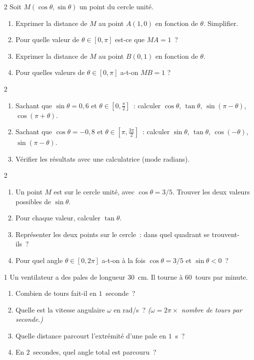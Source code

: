 \begin{probleme}{2}
Soit $M(\cos\theta,\sin\theta)$ un point du cercle unit\'e.
\begin{enumerate}
  \item Exprimer la distance de $M$ au point $A(1,0)$ en fonction de $\theta$.
        Simplifier.
  \item Pour quelle valeur de $\theta\in[0,\pi]$ est-ce que $MA=1$~?
  \item Exprimer la distance de $M$ au point $B(0,1)$ en fonction de $\theta$.
  \item Pour quelles valeurs de $\theta\in[0,\pi]$ a-t-on $MB=1$ ?
\end{enumerate}
\end{probleme}

\begin{probleme}{2}
\begin{enumerate}
  \item Sachant que $\sin\theta=0{,}6$ et $\theta\in[0,\frac{\pi}{2}]$~:
        calculer $\cos\theta$, $\tan\theta$, $\sin(\pi-\theta)$,
        $\cos(\pi+\theta)$.
  \item Sachant que $\cos\theta=-0{,}8$ et $\theta\in[\pi,\frac{3\pi}{2}]$~:
        calculer $\sin\theta$, $\tan\theta$, $\cos(-\theta)$,
        $\sin(\pi-\theta)$.
  \item V\'erifier les r\'esultats avec une calculatrice (mode radians).
\end{enumerate}
\end{probleme}

\begin{probleme}{2}
\begin{enumerate}
  \item Un point $M$ est sur le cercle unit\'e, avec $\cos\theta=3/5$.
        Trouver les deux valeurs possibles de $\sin\theta$.
  \item Pour chaque valeur, calculer $\tan\theta$.
  \item Repr\'esenter les deux points sur le cercle~:
        dans quel quadrant se trouvent-ils~?
  \item Pour quel angle $\theta\in[0,2\pi]$ a-t-on \`a la fois
        $\cos\theta=3/5$ et $\sin\theta<0$~?
\end{enumerate}
\end{probleme}

\begin{probleme}{1}
Un ventilateur a des pales de longueur $30$~cm.
Il tourne \`a $60$~tours par minute.
\begin{enumerate}
  \item Combien de tours fait-il en $1$~seconde~?
  \item Quelle est la vitesse angulaire $\omega$ en rad/s~?
        \emph{($\omega = 2\pi \times$ nombre de tours par seconde.)}
  \item Quelle distance parcourt l'extr\'emit\'e d'une pale en $1$~s~?
  \item En $2$~secondes, quel angle total est parcouru~?
\end{enumerate}
\end{probleme}

